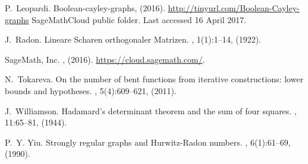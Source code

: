 \documentclass[11pt,a4paper]{jacodesmath}
\begin{document}
\begin{thebibliography}{20}
P.~Leopardi.
\newblock Boolean-cayley-graphs, (2016).
\newblock \url{http://tinyurl.com/Boolean-Cayley-graphs} SageMathCloud public
  folder. Last accessed 16 April 2017.

J.~Radon.
\newblock Lineare {Scharen} orthogonaler {Matrizen}.
, 1(1):1--14, (1922).

{SageMath, Inc.}
, (2016).
\newblock \url{https://cloud.sagemath.com/}.

N.~Tokareva.
\newblock On the number of bent functions from iterative constructions: lower
  bounds and hypotheses.
, 5(4):609--621, (2011).

J.~Williamson.
\newblock Hadamard's determinant theorem and the sum of four squares.
, 11:65--81, (1944).

P.~Y. Yiu.
\newblock Strongly regular graphs and {Hurwitz-Radon} numbers.
, 6(1):61--69, (1990).

\end{thebibliography}
\end{document}
